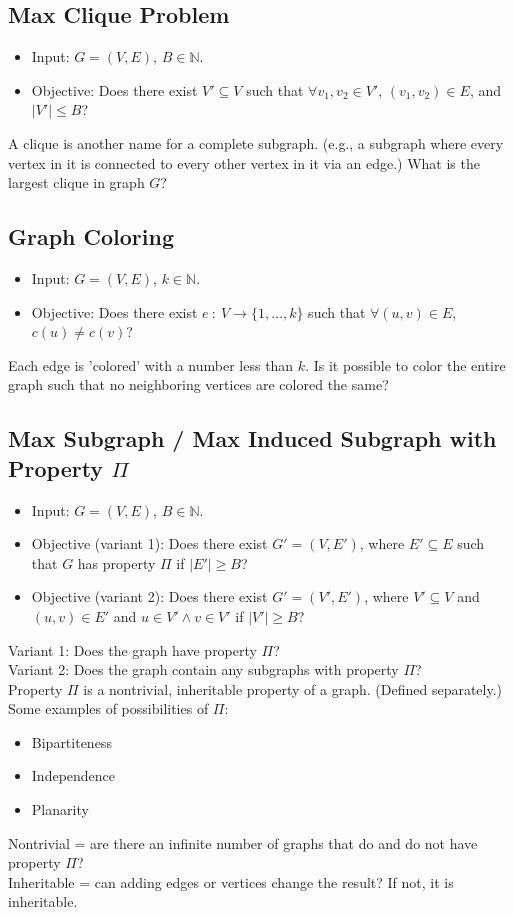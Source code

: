 \documentclass[10pt]{article}
\begin{document}
\subsection*{Max Clique Problem}
\begin{itemize}
	\item Input: $G = (V, E)$, $B \in \mathbb{N}$.
    \item Objective: Does there exist $V' \subseteq V$ such that $\forall v_1, v_2 \in V'$, $(v_1, v_2) \in E$, and $|V'| \leq B$?
\end{itemize}
A clique is another name for a complete subgraph.  (e.g., a subgraph where every vertex in it is connected to every other vertex in it via an edge.)  What is the largest clique in graph $G$?

\subsection*{Graph Coloring}
\begin{itemize}
	\item Input: $G = (V, E)$, $k \in \mathbb{N}$.
	\item Objective: Does there exist $e \::\: V \rightarrow \{1, \dots, k\}$ such that $\forall (u, v) \in E$, $c(u) \neq c(v)$?
\end{itemize}
Each edge is 'colored' with a number less than $k$.  Is it possible to color the entire graph such that no neighboring vertices are colored the same?

\subsection*{Max Subgraph / Max Induced Subgraph with Property $\Pi$}
\begin{itemize}
	\item Input: $G = (V, E)$, $B \in \mathbb{N}$.
	\item Objective (variant 1): Does there exist $G' = (V, E')$, where $E' \subseteq E$ such that $G$ has property $\Pi$ if $|E'| \geq B$?
	\item Objective (variant 2): Does there exist $G' = (V', E')$, where $V' \subseteq V$ and $(u, v) \in E'$ and $u \in V' \land v \in V'$ if $|V'| \geq B$?
\end{itemize}
Variant 1: Does the graph have property $\Pi$?\\
Variant 2: Does the graph contain any subgraphs with property $\Pi$?\\
Property $\Pi$ is a nontrivial, inheritable property of a graph.  (Defined separately.)  Some examples of possibilities of $\Pi$:
\begin{itemize}
	\item Bipartiteness 
	\item Independence
	\item Planarity
\end{itemize}
Nontrivial = are there an infinite number of graphs that do and do not have property $\Pi$?\\
Inheritable = can adding edges or vertices change the result?  If not, it is inheritable.
\end{document}
